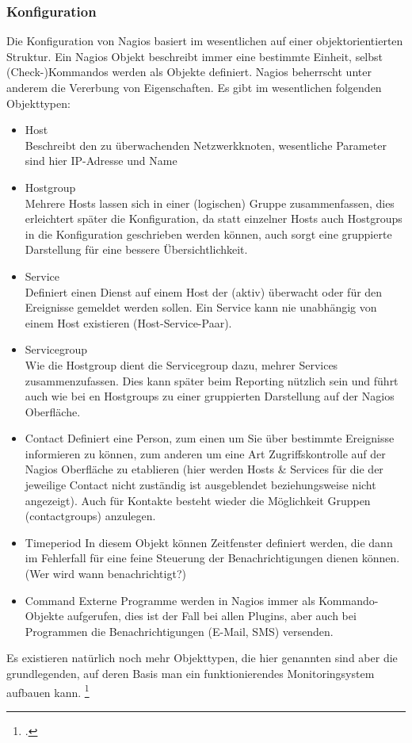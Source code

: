 \documentclass[12pt,a4paper,parskip,listof=totoc,bibliography=totoc]{scrreprt}
\begin{document}
	\subsubsection{Konfiguration}
	Die Konfiguration von Nagios basiert im wesentlichen auf einer objektorientierten Struktur. Ein Nagios Objekt beschreibt immer eine bestimmte Einheit, selbst (Check-)Kommandos werden als Objekte definiert. Nagios beherrscht unter anderem die Vererbung von Eigenschaften. Es gibt im wesentlichen folgenden Objekttypen:
	\begin{itemize}	
		\item Host \\
		Beschreibt den zu überwachenden Netzwerkknoten, wesentliche Parameter sind hier IP-Adresse und Name
		\item Hostgroup \\
		Mehrere Hosts lassen sich in einer (logischen) Gruppe zusammenfassen, dies erleichtert später die Konfiguration, da statt einzelner Hosts auch Hostgroups in die Konfiguration geschrieben werden können, auch sorgt eine gruppierte Darstellung für eine bessere Übersichtlichkeit.
		\item Service \\
		Definiert einen Dienst auf einem Host der (aktiv) überwacht oder für den Ereignisse gemeldet werden sollen. Ein Service kann nie unabhängig von einem Host existieren (Host-Service-Paar).
		\item Servicegroup \\
		Wie die Hostgroup dient die Servicegroup dazu, mehrer Services zusammenzufassen. Dies kann später beim Reporting nützlich sein und führt auch wie bei en Hostgroups zu einer gruppierten Darstellung auf der Nagios Oberfläche.
		\item Contact
		Definiert eine Person, zum einen um Sie über bestimmte Ereignisse informieren zu können, zum anderen um eine Art Zugriffskontrolle auf der Nagios Oberfläche zu etablieren (hier werden Hosts \& Services für die der jeweilige Contact nicht zuständig ist ausgeblendet beziehungsweise nicht angezeigt). Auch für Kontakte besteht wieder die Möglichkeit Gruppen (contactgroups) anzulegen.
		\item Timeperiod
		In diesem Objekt können Zeitfenster definiert werden, die dann im Fehlerfall für eine feine Steuerung der Benachrichtigungen dienen können. (Wer wird wann benachrichtigt?)
		\item Command
		Externe Programme werden in Nagios immer als Kommando-Objekte aufgerufen, dies ist der Fall bei allen Plugins, aber auch bei Programmen die Benachrichtigungen (E-Mail, SMS) versenden. 
	\end{itemize}
	Es existieren natürlich noch mehr Objekttypen, die hier genannten sind aber die grundlegenden, auf deren Basis man ein funktionierendes Monitoringsystem aufbauen kann.
	\footcite[Kapitel 2.2]{barthnagios}
	
\end{document}
